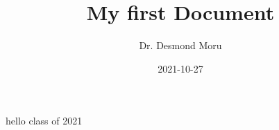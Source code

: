 \documentclass{article}
\title{My first Document}
\date{2021-10-27}
\author{Dr. Desmond Moru}
\begin{document}
	\maketitle
	\newpage
	hello class of 2021
\end{document}
